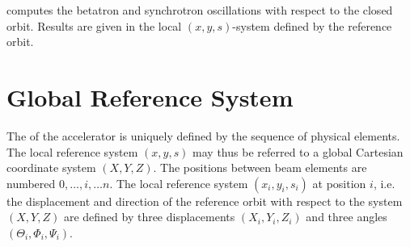 \opalmap computes the betatron and synchrotron oscillations
with respect to the closed orbit.
Results are given in the local $(x, y, s)$-system
defined by the reference orbit.

\section{Global Reference System}

The  
of the accelerator is uniquely defined by the sequence of physical elements.
The local reference system $(x, y, s)$
may thus be referred to a global Cartesian coordinate system $(X, Y, Z)$.
The positions between beam elements are numbered $0, \ldots , i, \ldots n$.
The local reference system $(x_i, y_i, s_i)$ at position $i$,
i.e. the displacement and direction of the reference orbit
with respect to the system $(X, Y, Z)$ are defined by three displacements 
$(X_i, Y_i, Z_i)$ and three angles $(\Theta_i, \Phi_i, \Psi_i)$.

